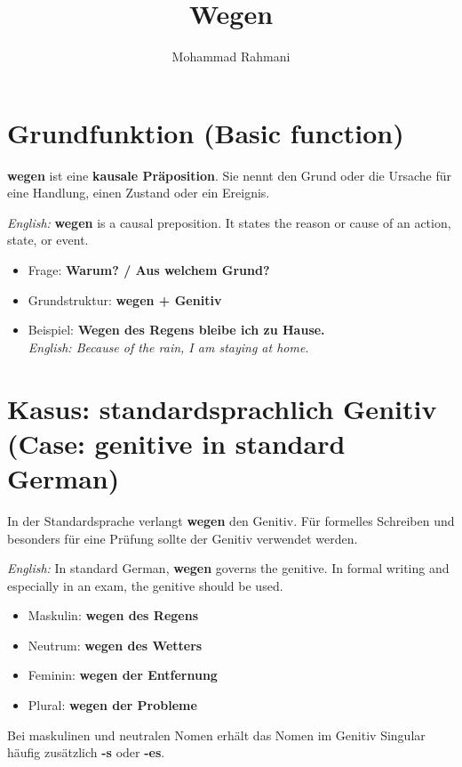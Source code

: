 \documentclass[a4paper]{article}
\title{Wegen}
\date{}
\author{Mohammad Rahmani}
\begin{document}
   \maketitle

   \section{Grundfunktion \textnormal{(Basic function)}}

   \textbf{wegen} ist eine \textbf{kausale Präposition}. Sie nennt den Grund oder die Ursache für eine Handlung, einen Zustand oder ein Ereignis.

   \textit{English:} \textbf{wegen} is a causal preposition. It states the reason or cause of an action, state, or event.

   \begin{itemize}
      \item Frage: \textbf{Warum? / Aus welchem Grund?}
      \item Grundstruktur: \textbf{wegen + Genitiv}
      \item Beispiel: \textbf{Wegen des Regens bleibe ich zu Hause.}\\
      \textit{English: Because of the rain, I am staying at home.}
   \end{itemize}

   \section{Kasus: standardsprachlich Genitiv \textnormal{(Case: genitive in standard German)}}

   In der Standardsprache verlangt \textbf{wegen} den Genitiv. Für formelles Schreiben und besonders für eine Prüfung sollte der Genitiv verwendet werden.

   \textit{English:} In standard German, \textbf{wegen} governs the genitive. In formal writing and especially in an exam, the genitive should be used.

   \begin{itemize}
      \item Maskulin: \textbf{wegen des Regens}
      \item Neutrum: \textbf{wegen des Wetters}
      \item Feminin: \textbf{wegen der Entfernung}
      \item Plural: \textbf{wegen der Probleme}
   \end{itemize}

   Bei maskulinen und neutralen Nomen erhält das Nomen im Genitiv Singular häufig zusätzlich \textbf{-s} oder \textbf{-es}.
\end{document}
